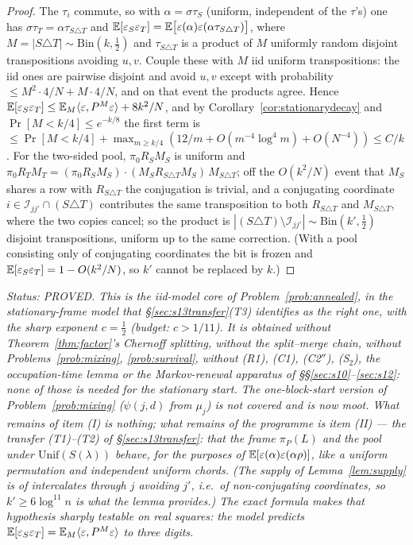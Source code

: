 \begin{proof}
The $\tau_i$ commute, so with $\alpha=\sigma\tau_S$ (uniform,
independent of the $\tau$'s) one has
$\sigma\tau_T=\alpha\tau_{S\triangle T}$ and
$\mathbb{E}[\varepsilon_S\varepsilon_T]=\mathbb{E}\bigl[\varepsilon(\alpha)\varepsilon(\alpha\tau_{S\triangle T})\bigr]$,
where $M=|S\triangle T|\sim\mathrm{Bin}(k,\tfrac12)$ and
$\tau_{S\triangle T}$ is a product of $M$ uniformly random disjoint
transpositions avoiding $u,v$.  Couple these with $M$ iid uniform
transpositions: the iid ones are pairwise disjoint and avoid $u,v$
except with probability $\le M^2\cdot4/N+M\cdot4/N$, and on that
event the products agree.  Hence
$\mathbb{E}[\varepsilon_S\varepsilon_T]\le\mathbb{E}_M\langle\varepsilon,P^M\varepsilon\rangle
+8k^2/N$, and by Corollary~\ref{cor:stationarydecay} and
$\Pr[M<k/4]\le e^{-k/8}$ the first term is
$\le\Pr[M<k/4]+\max_{m\ge k/4}(12/m+O(m^{-4}\log^4m)+O(N^{-4}))\le C/k$.  For the
two-sided pool, $\pi_0R_SM_S$ is uniform and
$\pi_0R_TM_T=(\pi_0R_SM_S)\cdot(M_SR_{S\triangle T}M_S)\,M_{S\triangle T}$;
off the $O(k^2/N)$ event that $M_S$ shares a row with
$R_{S\triangle T}$ the conjugation is trivial, and a conjugating
coordinate $i\in\mathcal I_{jj'}\cap(S\triangle T)$ contributes the
same transposition to both $R_{S\triangle T}$ and
$M_{S\triangle T}$, where the two copies cancel; so the product is
$|(S\triangle T)\setminus\mathcal I_{jj'}|\sim\mathrm{Bin}(k',\tfrac12)$
disjoint transpositions, uniform up to the same correction.  (With a
pool consisting only of conjugating coordinates the bit is frozen
and $\mathbb{E}[\varepsilon_S\varepsilon_T]=1-O(k^2/N)$, so $k'$ cannot be
replaced by $k$.)
\end{proof}

\emph{Status: PROVED.  This is the iid-model core of
Problem~\ref{prob:annealed}, in the \emph{stationary-frame} model
that \S\ref{sec:s13transfer}(T3) identifies as the right one, with
the sharp exponent $c=\tfrac12$ (budget: $c>1/11$).  It is obtained
without Theorem~\ref{thm:factor}'s Chernoff splitting, without the
split--merge chain, without Problems~\ref{prob:mixing},
\ref{prob:survival}, without (R1), (C1), (C2$''$), (S$_2$), the
occupation-time lemma or the Markov-renewal apparatus of
\S\S\ref{sec:s10}--\ref{sec:s12}: none of those is needed for the
stationary start.  The one-block-start version of
Problem~\ref{prob:mixing} ($\psi(j,d)$ from $\mu_j$) is not covered
and is now moot.  What remains of item (I) is nothing; what remains
of the programme is item (II) --- the transfer (T1)--(T2) of
\S\ref{sec:s13transfer}: that the frame $\pi_P(L)$ and the pool
under $\mathrm{Unif}(S(\lambda))$ behave, for the purposes of
$\mathbb{E}[\varepsilon(\alpha)\varepsilon(\alpha\rho)]$, like a uniform
permutation and independent uniform chords.  (The supply of Lemma~\ref{lem:supply} is of intercalates through
$j$ avoiding $j'$, i.e.\ of non-conjugating coordinates, so
$k'\ge6\log^{11}n$ is what the lemma provides.)  The exact formula makes
that hypothesis sharply testable on real squares: the model predicts
$\mathbb{E}[\varepsilon_S\varepsilon_T]=\mathbb{E}_M\langle\varepsilon,P^M\varepsilon\rangle$
to three digits.}

